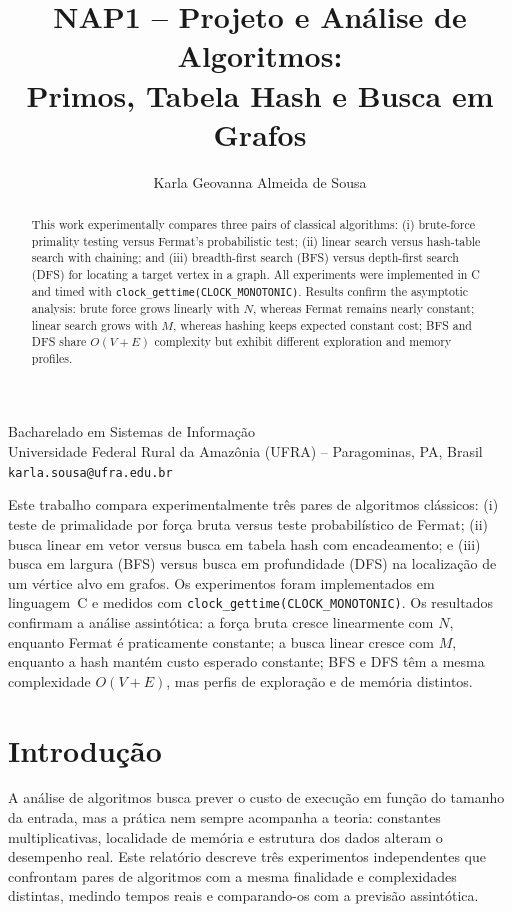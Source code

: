 \documentclass{SBCbookchapter}
\author{Karla Geovanna Almeida de Sousa}
\title{NAP1 -- Projeto e Análise de Algoritmos:\\
       Primos, Tabela Hash e Busca em Grafos}
\begin{document}
\maketitle

\begin{center}
Bacharelado em Sistemas de Informação\\
Universidade Federal Rural da Amazônia (UFRA) -- Paragominas, PA, Brasil\\
\verb|karla.sousa@ufra.edu.br|
\end{center}

\begin{abstract}
This work experimentally compares three pairs of classical algorithms:
(i) brute-force primality testing versus Fermat's probabilistic test;
(ii) linear search versus hash-table search with chaining; and
(iii) breadth-first search (BFS) versus depth-first search (DFS) for
locating a target vertex in a graph. All experiments were implemented
in C and timed with \texttt{clock\_gettime(CLOCK\_MONOTONIC)}.
Results confirm the asymptotic analysis: brute force grows linearly
with $N$, whereas Fermat remains nearly constant; linear search grows
with $M$, whereas hashing keeps expected constant cost; BFS and DFS
share $O(V+E)$ complexity but exhibit different exploration and
memory profiles.
\end{abstract}

\begin{resumo}
\begin{otherlanguage}{brazil}
Este trabalho compara experimentalmente três pares de algoritmos
clássicos: (i) teste de primalidade por força bruta versus teste
probabilístico de Fermat; (ii) busca linear em vetor versus busca em
tabela hash com encadeamento; e (iii) busca em largura (BFS) versus
busca em profundidade (DFS) na localização de um vértice alvo em
grafos. Os experimentos foram implementados em linguagem~C e medidos
com \texttt{clock\_gettime(CLOCK\_MONOTONIC)}. Os resultados
confirmam a análise assintótica: a força bruta cresce linearmente com
$N$, enquanto Fermat é praticamente constante; a busca linear cresce
com $M$, enquanto a hash mantém custo esperado constante; BFS e DFS
têm a mesma complexidade $O(V+E)$, mas perfis de exploração e de
memória distintos.
\end{otherlanguage}
\end{resumo}

\section{Introdução}
A análise de algoritmos busca prever o custo de execução em função do
tamanho da entrada, mas a prática nem sempre acompanha a teoria:
constantes multiplicativas, localidade de memória e estrutura dos dados
alteram o desempenho real. Este relatório descreve três experimentos
independentes que confrontam pares de algoritmos com a mesma finalidade
e complexidades distintas, medindo tempos reais e comparando-os com a
previsão assintótica.
\end{document}
